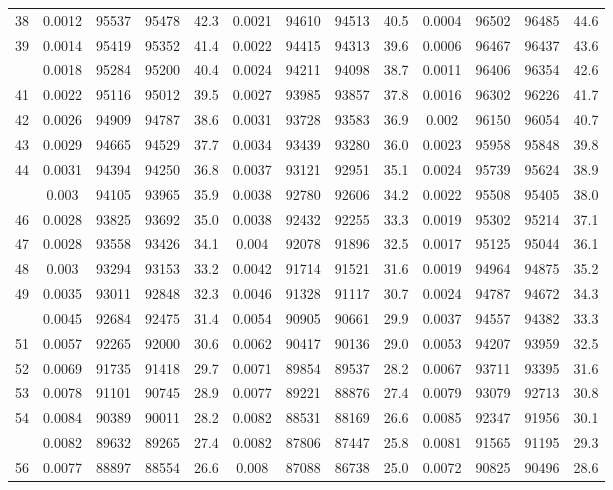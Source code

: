 \documentclass[
  14pt,
]{article}
\begin{document}
\begin{longtable}[t]{lcccccccccccc}
38 & 0.0012 & 95537 & 95478 & 42.3 & 0.0021 & 94610 & 94513 & 40.5 & 0.0004 & 96502 & 96485 & 44.6\\
39 & 0.0014 & 95419 & 95352 & 41.4 & 0.0022 & 94415 & 94313 & 39.6 & 0.0006 & 96467 & 96437 & 43.6\\
\addlinespace
40 & 0.0018 & 95284 & 95200 & 40.4 & 0.0024 & 94211 & 94098 & 38.7 & 0.0011 & 96406 & 96354 & 42.6\\
41 & 0.0022 & 95116 & 95012 & 39.5 & 0.0027 & 93985 & 93857 & 37.8 & 0.0016 & 96302 & 96226 & 41.7\\
42 & 0.0026 & 94909 & 94787 & 38.6 & 0.0031 & 93728 & 93583 & 36.9 & 0.002 & 96150 & 96054 & 40.7\\
43 & 0.0029 & 94665 & 94529 & 37.7 & 0.0034 & 93439 & 93280 & 36.0 & 0.0023 & 95958 & 95848 & 39.8\\
44 & 0.0031 & 94394 & 94250 & 36.8 & 0.0037 & 93121 & 92951 & 35.1 & 0.0024 & 95739 & 95624 & 38.9\\
\addlinespace
45 & 0.003 & 94105 & 93965 & 35.9 & 0.0038 & 92780 & 92606 & 34.2 & 0.0022 & 95508 & 95405 & 38.0\\
46 & 0.0028 & 93825 & 93692 & 35.0 & 0.0038 & 92432 & 92255 & 33.3 & 0.0019 & 95302 & 95214 & 37.1\\
47 & 0.0028 & 93558 & 93426 & 34.1 & 0.004 & 92078 & 91896 & 32.5 & 0.0017 & 95125 & 95044 & 36.1\\
48 & 0.003 & 93294 & 93153 & 33.2 & 0.0042 & 91714 & 91521 & 31.6 & 0.0019 & 94964 & 94875 & 35.2\\
49 & 0.0035 & 93011 & 92848 & 32.3 & 0.0046 & 91328 & 91117 & 30.7 & 0.0024 & 94787 & 94672 & 34.3\\
\addlinespace
50 & 0.0045 & 92684 & 92475 & 31.4 & 0.0054 & 90905 & 90661 & 29.9 & 0.0037 & 94557 & 94382 & 33.3\\
51 & 0.0057 & 92265 & 92000 & 30.6 & 0.0062 & 90417 & 90136 & 29.0 & 0.0053 & 94207 & 93959 & 32.5\\
52 & 0.0069 & 91735 & 91418 & 29.7 & 0.0071 & 89854 & 89537 & 28.2 & 0.0067 & 93711 & 93395 & 31.6\\
53 & 0.0078 & 91101 & 90745 & 28.9 & 0.0077 & 89221 & 88876 & 27.4 & 0.0079 & 93079 & 92713 & 30.8\\
54 & 0.0084 & 90389 & 90011 & 28.2 & 0.0082 & 88531 & 88169 & 26.6 & 0.0085 & 92347 & 91956 & 30.1\\
\addlinespace
55 & 0.0082 & 89632 & 89265 & 27.4 & 0.0082 & 87806 & 87447 & 25.8 & 0.0081 & 91565 & 91195 & 29.3\\
56 & 0.0077 & 88897 & 88554 & 26.6 & 0.008 & 87088 & 86738 & 25.0 & 0.0072 & 90825 & 90496 & 28.6\\

\end{longtable}
\end{document}
